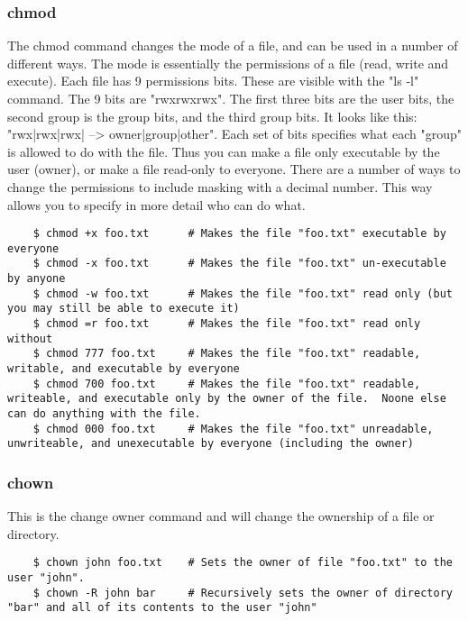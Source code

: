 \subsubsection{chmod} \mdseries
The chmod command changes the mode of a file, and can be used in a number of different ways.  The mode is essentially the permissions of a file (read, write and execute).  Each file has 9 permissions bits.  These are visible with the "ls -l" command.  The 9 bits are "rwxrwxrwx".  The first three bits are the user bits, the second group is the group bits, and the third group bits.  It looks like this: "rwx|rwx|rwx| --> owner|group|other".  Each set of bits specifies what each "group" is allowed to do with the file.  Thus you can make a file only executable by the user (owner), or make a file read-only to everyone.  There are a number of ways to change the permissions to include masking with a decimal number.  This way allows you to specify in more detail who can do what.

	\begin{verbatim}
	$ chmod +x foo.txt		# Makes the file "foo.txt" executable by everyone
	$ chmod -x foo.txt		# Makes the file "foo.txt" un-executable by anyone
	$ chmod -w foo.txt		# Makes the file "foo.txt" read only (but you may still be able to execute it)
	$ chmod =r foo.txt		# Makes the file "foo.txt" read only without 
	$ chmod 777 foo.txt		# Makes the file "foo.txt" readable, writable, and executable by everyone
	$ chmod 700 foo.txt		# Makes the file "foo.txt" readable, writeable, and executable only by the owner of the file.  Noone else can do anything with the file.
	$ chmod 000 foo.txt		# Makes the file "foo.txt" unreadable, unwriteable, and unexecutable by everyone (including the owner)
	\end{verbatim}
	
\subsubsection{chown} \mdseries
This is the change owner command and will change the ownership of a file or directory.  

	\begin{verbatim}
	$ chown john foo.txt	# Sets the owner of file "foo.txt" to the user "john".
	$ chown -R john bar		# Recursively sets the owner of directory "bar" and all of its contents to the user "john"
	\end{verbatim}

